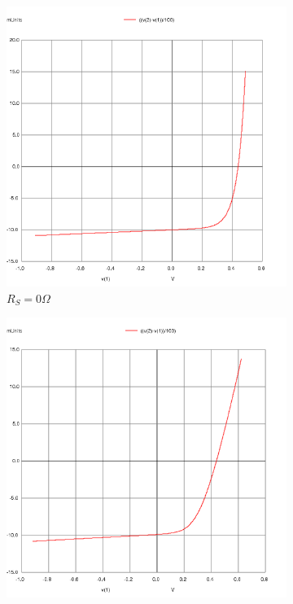 \documentclass[12pt]{article}
\begin{document}
\begin{figure}[H]
\centering
	\begin{subfigure}[b]{0.45\linewidth}
	   	\includegraphics[width = \linewidth, trim = {0 0 0 0}, clip]{part2_rs0.png}
		\caption{\( R_S = 0 \Omega\)}
	\end{subfigure}
	\begin{subfigure}[b]{0.45\linewidth}
		\includegraphics[width = \linewidth, trim = {0 0 0 0}, clip]{part2_rs10.png}

\end{subfigure}
\end{figure}
\end{document}
